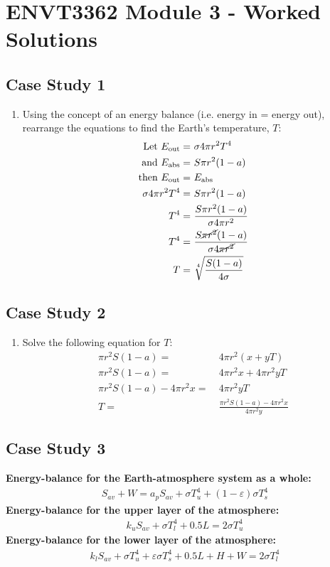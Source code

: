 \documentclass[11pt]{article}
\begin{document}
\section*{ENVT3362 Module 3 - Worked Solutions}
\subsection*{Case Study 1}
\begin{enumerate}
	\item{Using the concept of an energy balance (i.e. energy in = energy out), rearrange the equations to find the Earth's temperature, $T$:
\begin{align*}
	\text{Let } E_{\text{out}} = &\ \sigma 4\pi r^{2} T^{4}\\
	\text{and  } E_{\text{abs}} = &\ S\pi r^{2} (1-a)\\
	\text{then }E_{\text{out}} = &\ E_{\text{abs}}\\
	\sigma 4\pi r^{2} T^{4} = &\ S\pi r^{2} (1-a) \\
	T^{4} = &\ \frac{S\pi r^{2} (1-a)}{\sigma 4\pi r^{2}}\\
	T^{4} = &\ \frac{S\cancel{\pi r^{2}} (1-a)}{\sigma 4\cancel{\pi r^{2}}}\\
	T = &\ \sqrt[4]{\frac{S (1-a)}{4\sigma}}
\end{align*}
} 
\end{enumerate}

\subsection*{Case Study 2}
\begin{enumerate}
	\item{Solve the following equation for $T$:
	\begin{align*}
	\pi r^{2} S (1-a) =&\ 4\pi r^{2}(x+yT)\\
	\pi r^{2} S (1-a) =&\ 4\pi r^{2}x + 4\pi r^{2}yT\\
	\pi r ^{2}S(1-a) - 4\pi r^{2}x =&\ 4\pi r^{2}yT\\
	T =&\ \frac{\pi r ^{2}S(1-a) - 4\pi r^{2}x}{4\pi r^{2}y}
\end{align*}
	}
\end{enumerate}

\subsection*{Case Study 3}
\textbf{Energy-balance for the Earth-atmosphere system as a whole:}
\begin{align}\label{eq:3a}
	S_{av} + W = a_{p}S_{av} + \sigma T_{u}^{4} + (1 - \varepsilon)\sigma T_{s}^{4}
\end{align}
\textbf{Energy-balance for the upper layer of the atmosphere:}
\begin{align}\label{eq:3b}
	k_{u}S_{av} + \sigma T_{l}^{4} + 0.5L = 2\sigma T_{u}^{4}
\end{align}
\textbf{Energy-balance for the lower layer of the atmosphere:}
\begin{align}\label{eq:3c}
	k_{l}S_{av} + \sigma T_{u}^{4} + \varepsilon \sigma T_{s}^{4} + 0.5L + H + W = 2\sigma T_{l}^{4}
\end{align}
\end{document}
